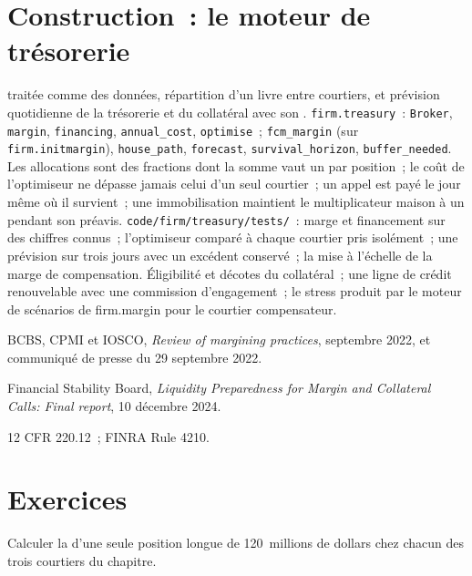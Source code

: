 \section{Construction~: le moteur de trésorerie}\label{bld:fm:treasury-and-funding:treasury}

\begin{build}
  traitée comme des données, répartition d'un livre entre courtiers, et prévision quotidienne de la trésorerie et du collatéral avec son
.
 \texttt{firm.treasury}~: \texttt{Broker}, \texttt{margin}, \texttt{financing}, \texttt{annual\_cost}, \texttt{optimise}~;
\texttt{fcm\_margin} (sur \texttt{firm.initmargin}), \texttt{house\_path}, \texttt{forecast}, \texttt{survival\_horizon}, \texttt{buffer\_needed}.
 Les allocations sont des fractions dont la somme vaut un par position~; le coût de l'optimiseur ne dépasse jamais celui d'un seul courtier~; un appel est payé le
jour même où il survient~; une immobilisation maintient le multiplicateur maison à un pendant son préavis.
 \texttt{code/firm/treasury/tests/}~: marge et financement sur des chiffres connus~; l'optimiseur comparé à chaque courtier pris isolément~; une
prévision sur trois jours avec un excédent conservé~; la mise à l'échelle de la marge de compensation.
 Éligibilité et décotes du collatéral~; une ligne de crédit renouvelable avec une commission d'engagement~; le stress produit par le moteur de scénarios de firm.margin
pour le courtier compensateur.
\end{build}

\begin{omsources}
\item BCBS, CPMI et IOSCO, \emph{Review of margining practices}, septembre 2022, et communiqué de presse du 29 septembre 2022.
\item Financial Stability Board, \emph{Liquidity Preparedness for Margin and Collateral Calls: Final report}, 10 décembre 2024.
\item 12 CFR 220.12~; FINRA Rule 4210.
\end{omsources}

\section{Exercices}

\begin{exercise}[$\star$]\label{exo:fm:treasury-and-funding:1}
Calculer la  d'une seule position longue de 120~millions de dollars chez chacun des trois courtiers du chapitre.
\end{exercise}

